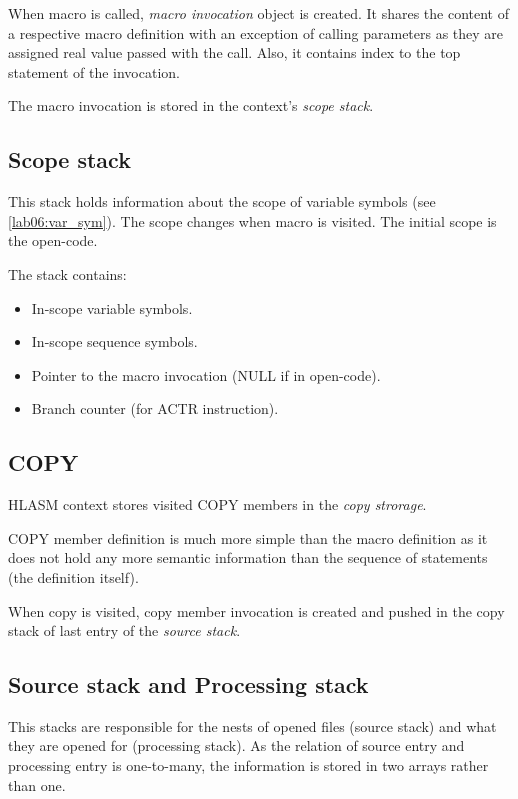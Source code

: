 When macro is called, \emph{macro invocation} object is created. It shares the content of a respective macro definition with an exception of calling parameters as they are assigned real value passed with the call. Also, it contains index to the top statement of the invocation.

The macro invocation is stored in the context's \emph{scope stack}.

\subsection{Scope stack}

This stack holds information about the scope of variable symbols (see \cref{lab06:var_sym}). The scope changes when macro is visited. The initial scope is the open-code. 


The stack contains:
\begin{itemize}
	\item In-scope variable symbols.
	\item In-scope sequence symbols.
	\item Pointer to the macro invocation (NULL if in open-code).
	\item Branch counter (for ACTR instruction).
\end{itemize}

\subsection{COPY}

HLASM context stores visited COPY members in the \emph{copy strorage}.

COPY member definition is much more simple than the macro definition as it does not hold any more semantic information than the sequence of statements (the definition itself).

When copy is visited, copy member invocation is created and pushed in the copy stack of last entry of the \emph{source stack}.

\subsection{Source stack and Processing stack}

This stacks are responsible for the nests of opened files (source stack) and what they are opened for (processing stack). As the relation of source entry and processing entry is one-to-many, the information is stored in two arrays rather than one.

